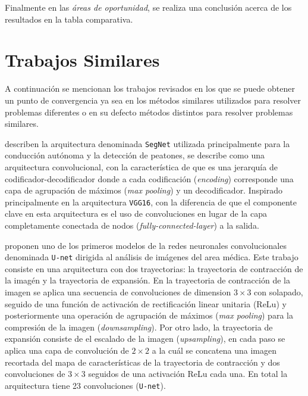 Finalmente en las \emph{áreas de oportunidad}, se realiza una conclusión acerca de los resultados en la tabla comparativa.

\section{Trabajos Similares}

A continuación se mencionan los trabajos revisados en los que se puede obtener un punto de convergencia ya sea en los métodos similares utilizados para resolver problemas diferentes o en su defecto métodos distintos para resolver problemas similares.

\citet{DBLP:journals/corr/BadrinarayananK15} describen la arquitectura denominada \texttt{SegNet} utilizada principalmente para la conducción autónoma y la detección de peatones, se describe como una arquitectura convolucional, con la característica de que es una jerarquía de codificador-decodificador donde a cada codificación (\emph{encoding}) corresponde una capa de agrupación de máximos (\emph{max pooling}) y un decodificador. Inspirado principalmente en la arquitectura \texttt{VGG16}, con la diferencia de que el componente clave en esta arquitectura es el uso de convoluciones en lugar de la capa completamente conectada de nodos (\emph{fully-connected-layer}) a la salida.

\citet{DBLP:journals/corr/RonnebergerFB15} proponen uno de los primeros modelos de la redes neuronales convolucionales denominada \texttt{U-net} dirigida al análisis de imágenes del area médica. Este trabajo consiste en una arquitectura con dos trayectorias: la trayectoria de contracción de la imagén y la trayectoria de expansión. En la trayectoria de contracción de la imagen se aplica una secuencia de convoluciones de dimension $3 \times 3$ con solapado, seguido de una función de activación de rectificación linear unitaria (ReLu) y posteriormente una operación de agrupación de máximos (\emph{max pooling}) para la compresión de la imagen (\emph{downsampling}). Por otro lado, la trayectoria de expansión consiste de el escalado de la imagen (\emph{upsampling}), en cada paso se aplica una capa de convolución de $2 \times 2$ a la cuál se concatena una imagen recortada del mapa de características de la trayectoria de contracción y dos convoluciones de $3 \times 3$ seguidos de una activación ReLu cada una. En total la arquitectura tiene 23 convoluciones (\texttt{U-net}).


